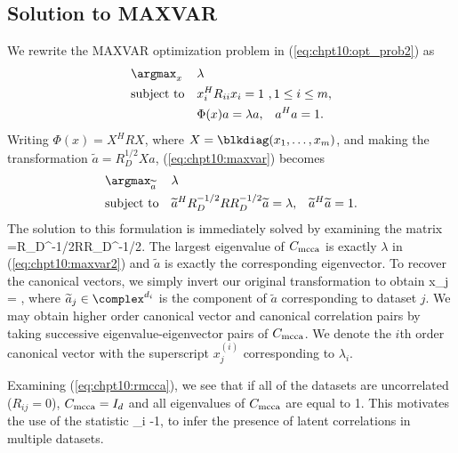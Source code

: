 \subsection{Solution to MAXVAR}
We rewrite the MAXVAR optimization problem in (\ref{eq:chpt10:opt_prob2}) as
\begin{equation}\label{eq:chpt10:maxvar}
\begin{aligned}
&\argmax_{x}&&\lambda\\
&\text{subject to} &&x_i^HR_{ii}x_i  = 1\,\,,1\leq i\leq m,\\
&&&\Phi(x) a = \lambda a, \,\,\,\,\,a^Ha=1.\\
\end{aligned}
\end{equation}
Writing $\Phi(x) = X^H R X$, where $X=\blkdiag(x_1,\dots,x_m)$, and making the
transformation $\widetilde{a}=R_D^{1/2}Xa$, (\ref{eq:chpt10:maxvar}) becomes
\begin{equation}\label{eq:chpt10:maxvar2}
\begin{aligned}
&\argmax_{\widetilde{a}}&&\lambda\\
&\text{subject to}&& \widetilde{a}^HR_D^{-1/2}RR_D^{-1/2}\widetilde{a} = \lambda,\,\,\,\,\, \widetilde{a}^H\widetilde{a}=1.\\
\end{aligned}
\end{equation}
The solution to this formulation is immediately solved by examining the matrix
\beq\label{eq:chpt10:rmcca}
\Rmcca =R_D^{-1/2}RR_D^{-1/2}.
\eeq
The largest eigenvalue of $C_{\text{mcca}}$ is exactly $\lambda$ in (\ref{eq:chpt10:maxvar2}) and
$\widetilde{a}$ is exactly the corresponding eigenvector. To recover the canonical
vectors, we simply invert our original transformation to obtain
\beq\label{eq:chpt10:can_vect}
x_j = ,
\eeq
where $\widetilde{a}_j\in\complex^{d_i}$ is the component of $\widetilde{a}$ corresponding
to dataset $j$. We may obtain higher order canonical vector and canonical correlation
pairs by taking successive eigenvalue-eigenvector pairs of $C_{\text{mcca}}$. We denote the $i$th
order canonical vector with the superscript $x_j^{(i)}$ corresponding to $\lambda_i$.

Examining (\ref{eq:chpt10:rmcca}), we see that if all of the datasets are uncorrelated
($R_{ij}=0$), $C_{\text{mcca}}=I_d$ and all eigenvalues of $C_{\text{mcca}}$ are equal to 1. This motivates the use of the statistic
\beq\label{eq:chpt10:mcca_stat}
\lambda_i -1,
\eeq
to infer the presence of latent correlations in multiple datasets.

